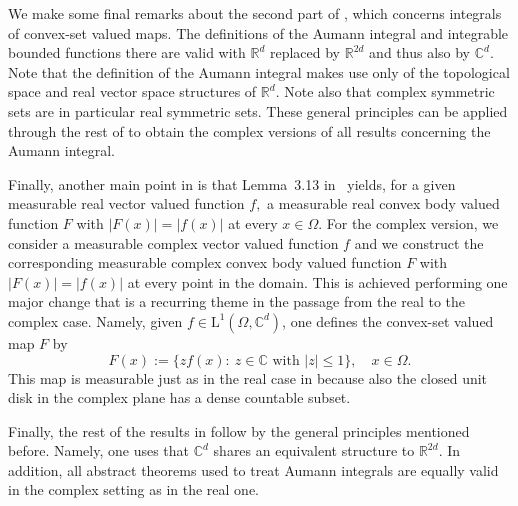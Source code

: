 \documentclass{article}
\theoremstyle{definition}
\theoremstyle{remark}
\numberwithin{equation}{section}
\newcommand{\reals}{\mathbb{R}}
\newcommand{\complex}{\mathbb{C}}
\newcommand{\1}{\mathbf{1}}
\newcommand{\matrices}[2]{\mathrm{M}_{{#1}}({#2})}
\newcommand{\complexball}[1]{\mathbf{\overline{B}}_{\complex^{{#1}}}}
\begin{document}

    We make some final remarks about the second part of \cite[Section 3]{Cruz_Uribe_Bownik_Extrapolation}, which concerns integrals of convex-set valued maps.
    The definitions of the Aumann integral and integrable bounded functions there are valid with $\reals^{d}$ replaced by $\reals^{2d}$ and thus also by $\complex^d$.
    Note that the definition of the Aumann integral makes use only of the topological space and real vector space structures of $\reals^d$.
    Note also that complex symmetric sets are in particular real symmetric sets.
    These general principles can be applied through the rest of \cite[Section 3]{Cruz_Uribe_Bownik_Extrapolation} to obtain the complex versions of all results concerning the Aumann integral.

    Finally, another main point in \cite[Section 3]{Cruz_Uribe_Bownik_Extrapolation} is that
    Lemma~3.13 in~\cite{Cruz_Uribe_Bownik_Extrapolation} yields,
    for a given measurable real vector valued function $f,$
    a measurable real convex body valued function $F$ with $|F(x)| = |f(x)|$ at every $x \in \Omega.$
    For the complex version, we consider a measurable complex vector valued function $f$
    and we construct the corresponding measurable complex convex body valued function $F$
    with $|F(x)| = |f(x)|$ at every point in the domain.
    This is achieved performing one major change that is a recurring theme in the passage from the real to the complex case. Namely, given $f\in\mathrm{L}^1(\Omega,\complex^d)$, one defines the convex-set valued map $F$ by
    \begin{equation*}
        F(x):=\{zf(x):~z\in\complex\text{ with }|z|\leq1\},\quad x\in\Omega.
    \end{equation*}
    This map is measurable just as in the real case in \cite[Lemma 3.13]{Cruz_Uribe_Bownik_Extrapolation} because also the closed unit disk in the complex plane has a dense countable subset.

    Finally, the rest of the results in \cite[Section 3]{Cruz_Uribe_Bownik_Extrapolation} follow by the general principles mentioned before.
    Namely, one uses that $\complex^d$ shares an equivalent structure to $\reals^{2d}.$
    In addition, all abstract theorems used to treat Aumann integrals are equally valid in the complex setting as in the real one.
    
\end{document}
